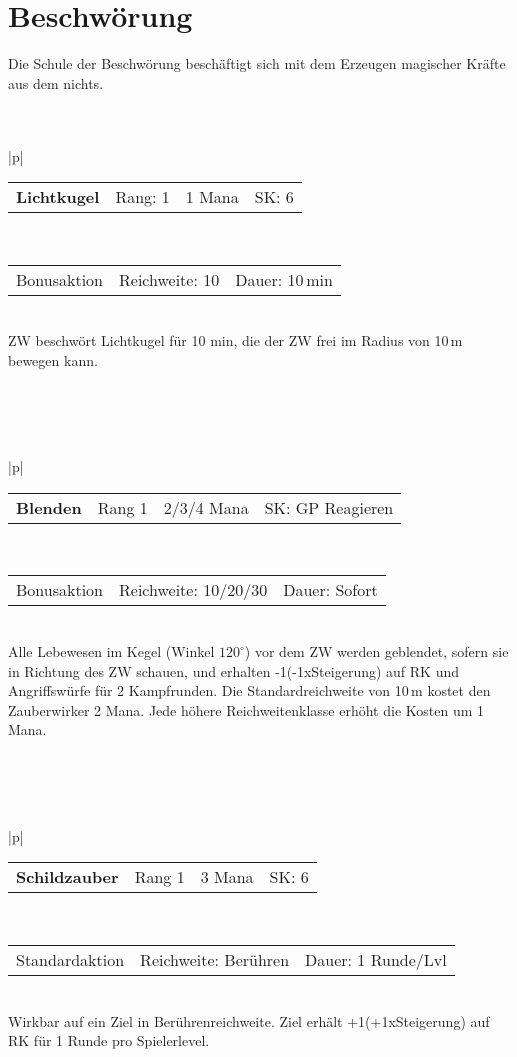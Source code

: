 \documentclass[../../Heldenanleitung2]{subfiles}
\begin{document}
\section{Beschwörung}

Die Schule der Beschwörung beschäftigt sich mit dem Erzeugen magischer Kräfte aus dem nichts.
\\\\\\
\begin{tabular}{|p{\textwidth}|}
\hline
\begin{tabularx}{\textwidth}{X|X|X|X}
\textbf{Lichtkugel} & Rang: 1 & 1 Mana & SK: 6
\end{tabularx} \\ \hline
\begin{tabularx}{\textwidth}{X|X|X}
Bonusaktion & Reichweite: 10 & Dauer: 10\,min
\end{tabularx} \\ \hline
ZW beschwört Lichtkugel für 10 min, die der ZW frei im Radius von 10\,m bewegen kann.
\\ \hline
\end{tabular}
\\\\\\
\begin{tabular}{|p{\textwidth}|}
\hline
\begin{tabularx}{\textwidth}{X|X|X|X}
\textbf{Blenden} & Rang 1 & 2/3/4 Mana & SK: GP Reagieren
\end{tabularx} \\ \hline
\begin{tabularx}{\textwidth}{X|X|X}
Bonusaktion & Reichweite: 10/20/30 & Dauer: Sofort
\end{tabularx} \\ \hline
Alle Lebewesen im Kegel (Winkel $120^\circ$) vor dem ZW werden geblendet, sofern sie in Richtung des ZW schauen, und erhalten -1(-1xSteigerung) auf RK und Angriffswürfe für 2 Kampfrunden. Die Standardreichweite von 10\,m kostet den Zauberwirker 2 Mana. Jede höhere Reichweitenklasse erhöht die Kosten um 1 Mana.
\\ \hline
\end{tabular}
\\\\\\
\begin{tabular}{|p{\textwidth}|}
\hline
\begin{tabularx}{\textwidth}{X|X|X|X}
\textbf{Schildzauber} & Rang 1 & 3 Mana & SK: 6
\end{tabularx} \\ \hline
\begin{tabularx}{\textwidth}{X|X|X}
Standardaktion & Reichweite: Berühren & Dauer: 1 Runde/Lvl
\end{tabularx} \\ \hline
Wirkbar auf ein Ziel in Berührenreichweite. Ziel erhält +1(+1xSteigerung) auf RK für 1 Runde pro Spielerlevel.
\\ \hline
\end{tabular}
\end{document}
